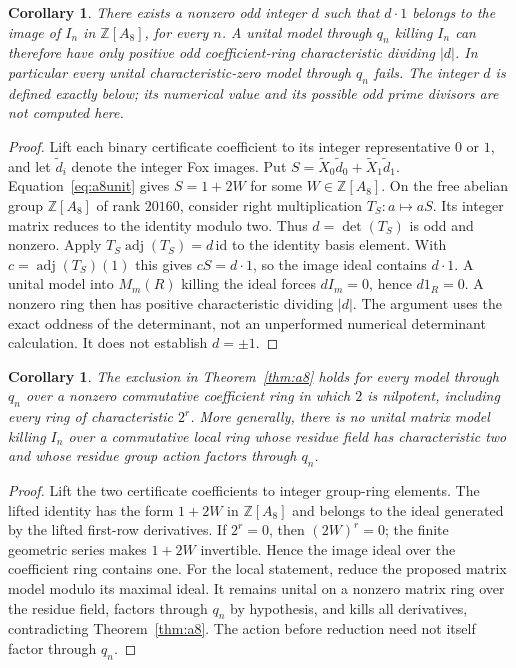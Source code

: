 \documentclass[11pt]{article}
\newtheorem{corollary}[theorem]{Corollary}
\newcommand{\Z}{\mathbb Z}
\begin{document}
\begin{corollary}\label{cor:characteristic}
There exists a nonzero odd integer $d$ such that $d\cdot1$ belongs to
the image of $I_n$ in $\Z[A_8]$, for every $n$.
A unital model through $q_n$ killing $I_n$ can therefore have only
positive odd coefficient-ring characteristic dividing $|d|$.
In particular every unital characteristic-zero model through $q_n$ fails.
The integer $d$ is defined exactly below; its numerical value and its
possible odd prime divisors are not computed here.
\end{corollary}
\begin{proof}
Lift each binary certificate coefficient to its integer representative
$0$ or $1$, and let $\widetilde d_i$ denote the integer Fox images. Put
$S=\widetilde X_0\widetilde d_0+\widetilde X_1\widetilde d_1$.
Equation~\eqref{eq:a8unit} gives $S=1+2W$ for some $W\in\Z[A_8]$.
On the free abelian group $\Z[A_8]$ of rank $20160$, consider right
multiplication $T_S:a\mapsto aS$. Its integer matrix reduces to the
identity modulo two. Thus $d=\det(T_S)$ is odd and nonzero.
Apply $T_S\operatorname{adj}(T_S)=d\,\mathrm{id}$ to the identity
basis element. With $c=\operatorname{adj}(T_S)(1)$ this gives
$cS=d\cdot1$, so the image ideal contains $d\cdot1$.
A unital model into $M_m(R)$ killing the ideal forces
$dI_m=0$, hence $d1_R=0$. A nonzero ring then has positive
characteristic dividing $|d|$. The argument uses the exact oddness
of the determinant, not an unperformed numerical determinant
calculation. It does not establish $d=\pm1$.
\end{proof}

\begin{corollary}\label{cor:lifts}
The exclusion in Theorem~\ref{thm:a8} holds for every model through
$q_n$ over a nonzero commutative coefficient ring in which $2$ is
nilpotent, including every ring of characteristic $2^r$.
More generally, there is no unital matrix model killing $I_n$ over
a commutative local ring whose residue field has characteristic two
and whose residue group action factors through $q_n$.
\end{corollary}
\begin{proof}
Lift the two certificate coefficients to integer group-ring elements.
The lifted identity has the form $1+2W$ in $\Z[A_8]$ and belongs to
the ideal generated by the lifted first-row derivatives.
If $2^r=0$, then $(2W)^r=0$; the finite geometric series makes
$1+2W$ invertible. Hence the image ideal over the coefficient ring
contains one. For the local statement, reduce the proposed matrix
model modulo its maximal ideal. It remains unital on a nonzero
matrix ring over the residue field, factors through $q_n$ by
hypothesis, and kills all derivatives, contradicting
Theorem~\ref{thm:a8}. The action before reduction need not itself
factor through $q_n$.
\end{proof}
\end{document}
